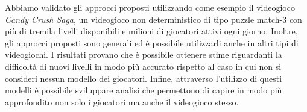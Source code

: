 Abbiamo validato gli approcci proposti utilizzando come esempio il videogioco \textit{Candy Crush Saga}, un videogioco non deterministico di tipo puzzle match-3 con pi\`u di tremila livelli disponibili e milioni di giocatori attivi ogni giorno. Inoltre, gli approcci proposti sono generali ed \`e possibile utilizzarli anche in altri tipi di videogiochi. I risultati provano che \`e possibile ottenere stime riguardanti la difficolt\`a di nuovi livelli in modo pi\`u accurato rispetto al caso in cui non si consideri nessun modello dei giocatori. Infine, attraverso l'utilizzo di questi modelli \`e possibile sviluppare analisi che permettono di capire in modo pi\`u approfondito non solo i giocatori ma anche il videogioco stesso.